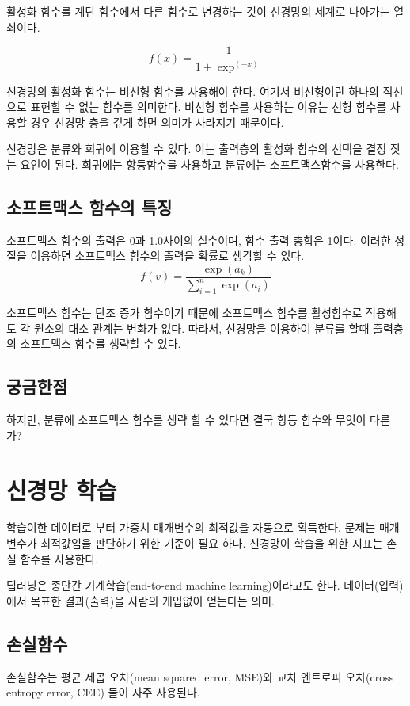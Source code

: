 \documentclass[12pt]{article}
\begin{document}
	활성화 함수를 계단 함수에서 다른 함수로 변경하는 것이 신경망의 세계로 나아가는 열쇠이다.
	
	\[ f(x)=\frac{1}{1+\exp^(-x)}	\]
	
	신경망의 활성화 함수는 비선형 함수를 사용해야 한다. 여기서 비선형이란 하나의 직선으로 표현할 수 없는 함수를 의미한다.
	비선형 함수를 사용하는 이유는 선형 함수를 사용할 경우 신경망 층을 깊게 하면 의미가 사라지기 때문이다.
	
	신경망은 분류와 회귀에 이용할 수 있다. 이는 출력층의 활성화 함수의 선택을 결정 짓는 요인이 된다. 회귀에는 항등함수를 사용하고 분류에는 소프트맥스함수를 사용한다.
	
	\subsection{소프트맥스 함수의 특징}
	소프트맥스 함수의 출력은 0과 1.0사이의 실수이며, 함수 출력 총합은 1이다.
	이러한 성질을 이용하면 소프트맥스 함수의 출력을 확률로 생각할 수 있다.
	\[ f(v) = \frac{\exp(a_{k})} {\sum_{i=1}^{n}  {\exp(a_{i})}} \]
	
	소프트맥스 함수는 단조 증가 함수이기 때문에 소프트맥스 함수를 활성함수로 적용해도 각 원소의 대소 관계는 변화가 없다. 따라서, 신경망을 이용하여 분류를 할때 출력층의 소프트맥스 함수를 생략할 수 있다.
	
	\subsection{궁금한점}
	하지만, 분류에 소프트맥스 함수를 생략 할 수 있다면 결국 항등 함수와 무엇이 다른가?
	\clearpage
	
\section{신경망 학습}
학습이한 데이터로 부터 가중치 매개변수의 최적값을 자동으로 획득한다.
문제는 매개 변수가 최적값임을 판단하기 위한 기준이 필요 하다.
신경망이 학습을 위한 지표는 손실 함수를 사용한다.

딥러닝은 종단간 기계학습(end-to-end machine learning)이라고도 한다. 데이터(입력)에서 목표한 결과(출력)을 사람의 개입없이 얻는다는 의미.

\subsection{손실함수}

손실함수는 평균 제곱 오차(mean squared error, MSE)와 교차 엔트로피 오차(cross entropy error, CEE) 둘이 자주 사용된다.
\end{document}
